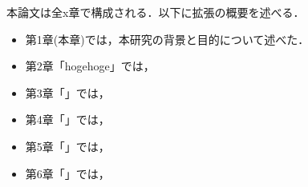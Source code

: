         本論文は全x章で構成される．以下に拡張の概要を述べる．

        \begin{itemize}
                \item 第1章(本章)では，本研究の背景と目的について述べた．
                \item 第2章「hogehoge」では，
                \item 第3章「」では，
                \item 第4章「」では，
                \item 第5章「」では，
                \item 第6章「」では，
        \end{itemize}
        


        
